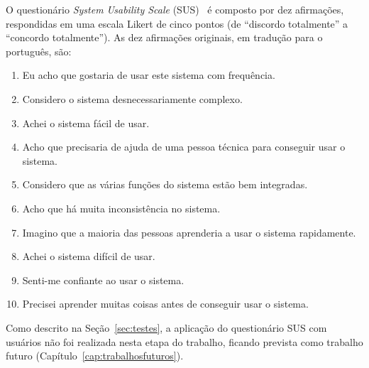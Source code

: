 O questionário \emph{System Usability Scale} (SUS)~\cite{brooke1996} é composto por dez
afirmações, respondidas em uma escala Likert de cinco pontos (de ``discordo totalmente'' a
``concordo totalmente''). As dez afirmações originais, em tradução para o português, são:

\begin{enumerate}
    \item Eu acho que gostaria de usar este sistema com frequência.
    \item Considero o sistema desnecessariamente complexo.
    \item Achei o sistema fácil de usar.
    \item Acho que precisaria de ajuda de uma pessoa técnica para conseguir usar o sistema.
    \item Considero que as várias funções do sistema estão bem integradas.
    \item Acho que há muita inconsistência no sistema.
    \item Imagino que a maioria das pessoas aprenderia a usar o sistema rapidamente.
    \item Achei o sistema difícil de usar.
    \item Senti-me confiante ao usar o sistema.
    \item Precisei aprender muitas coisas antes de conseguir usar o sistema.
\end{enumerate}

Como descrito na Seção~\ref{sec:testes}, a aplicação do questionário SUS com usuários não foi
realizada nesta etapa do trabalho, ficando prevista como trabalho futuro
(Capítulo~\ref{cap:trabalhosfuturos}).
